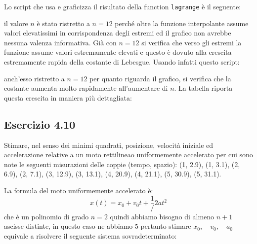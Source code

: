Lo script che usa e graficizza il risultato della function \lstinline{lagrange} è il seguente:

il valore $n$ è stato ristretto a $n=12$ perché oltre la funzione interpolante assume valori elevatissimi in corrispondenza degli estremi ed il grafico non avrebbe nessuna valenza informativa. Già con $n=12$ si verifica che verso gli estremi la funzione assume valori estremamente elevati e questo è dovuto alla crescita estremamente rapida della costante di Lebesgue. Usando infatti questo script:

anch'esso ristretto a $n=12$ per quanto riguarda il grafico, si verifica che la costante aumenta molto rapidamente all'aumentare di $n$. La tabella riporta questa crescita in maniera più dettagliata:




	\subsection {Esercizio 4.10}
Stimare, nel senso dei minimi quadrati, posizione, velocità iniziale ed accelerazione relative a un moto rettilineao uniformemente accelerato per cui sono note le seguenti misurazioni delle coppie (tempo, spazio): (1, 2.9), (1, 3.1), (2, 6.9), (2, 7.1), (3, 12.9), (3, 13.1), (4, 20.9), (4, 21.1), (5, 30.9), (5, 31.1).

La formula del moto uniformemente accelerato è:
\begin{equation*}
	x(t) = x_0 + v_0t +\frac{1}/{2}at^2
\end{equation*}
che è un polinomio di grado $n=2$ quindi abbiamo bisogno di almeno $n+1$ ascisse distinte, in questo caso ne abbiamo $5$ pertanto stimare $x_0, \quad v_0, \quad a_0$ equivale a risolvere il seguente sistema sovradeterminato:

